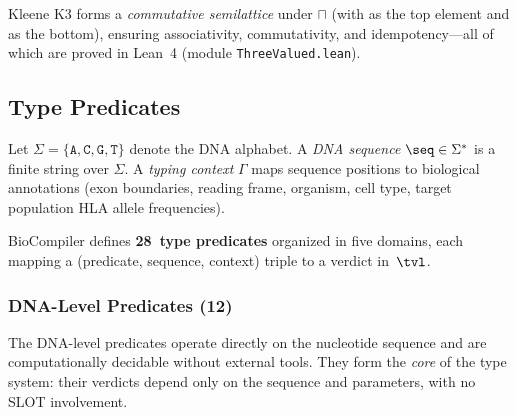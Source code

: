 \noindent Kleene K3 forms a \emph{commutative semilattice} under
$\sqcap$ (with \PASS{} as the top element and \FAIL{} as the bottom),
ensuring associativity, commutativity, and idempotency---all of which
are proved in Lean~4 (module \texttt{ThreeValued.lean}).

\subsection{Type Predicates}\label{sec:predicates}

Let $\Sigma = \{\texttt{A}, \texttt{C}, \texttt{G}, \texttt{T}\}$
denote the DNA alphabet.
A \emph{DNA sequence} $\seq \in \Sigma^*$ is a finite string over
$\Sigma$.
A \emph{typing context} $\Gamma$ maps sequence positions to biological
annotations (exon boundaries, reading frame, organism, cell type,
target population HLA allele frequencies).

BioCompiler defines \textbf{28~type predicates} organized in five
domains, each mapping a (predicate, sequence, context) triple to a
verdict in~$\tvl$.

\subsubsection{DNA-Level Predicates (12)}

The DNA-level predicates operate directly on the nucleotide sequence
and are computationally decidable without external tools.
They form the \emph{core} of the type system: their verdicts depend
only on the sequence and parameters, with no SLOT involvement.

